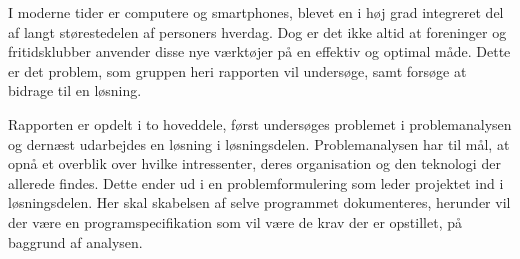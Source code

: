 I moderne tider er computere og smartphones, blevet en i høj grad integreret del af langt størestedelen af personers hverdag. 
Dog er det ikke altid at foreninger og fritidsklubber anvender disse nye værktøjer på en effektiv og optimal måde. 
Dette er det problem, som gruppen heri rapporten vil undersøge, samt forsøge at bidrage til en løsning. 

Rapporten er opdelt i to hoveddele, først undersøges problemet i problemanalysen og dernæst udarbejdes en løsning i løsningsdelen. 
Problemanalysen har til mål, at opnå et overblik over hvilke intressenter, deres organisation og den teknologi der allerede findes. 
Dette ender ud i en problemformulering som leder projektet ind i løsningsdelen. 
Her skal skabelsen af selve programmet dokumenteres, herunder vil der være en programspecifikation som vil være de krav der er opstillet, på baggrund af analysen. 
